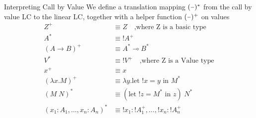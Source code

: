 \documentclass[10pt]{beamer}
\newcommand{\lam}[2]{\lambda #1 . #2}
\newcommand{\llet}[3]{\text{let }  ! #1 = #2 \text{ in } #3}
\newcommand{\app}[2]{#1 \; #2}
\newcommand{\minus}{\scalebox{0.75}[1.0]{$-$}}
\begin{document}
\begin{frame}[fragile]{Interpreting Call by Value}
  We define a translation mapping $(\minus)^*$ from the call by value LC to the linear LC, together with a helper function $(\minus)^+$ on values \\

  \begin{align*}
    Z^+                             & \equiv Z \quad \text{,where Z is a basic type}     \\
    A^*                             & \equiv ! A^+                                       \\
    (A \rightarrow B)^+             & \equiv A^* \multimap B^*                           \\
    V^*                             & \equiv ! V^+ \quad \text{,where Z is a Value type} \\
    x^+                             & \equiv x                                           \\
    (\lam{x}{M})^+                  & \equiv \lam{y}{\llet{x}{y}{M^*}}                   \\
    (\app{M}{N})^*                  & \equiv \app{(\llet{z}{M^*}{z})}{N^*}               \\
    (x_1 : A_1, \dots, x_n : A_n)^* & \equiv ! x_1 : ! A_1^+, \dots, ! x_n : ! A_n^+     \\
  \end{align*}
\end{frame}
\end{document}
